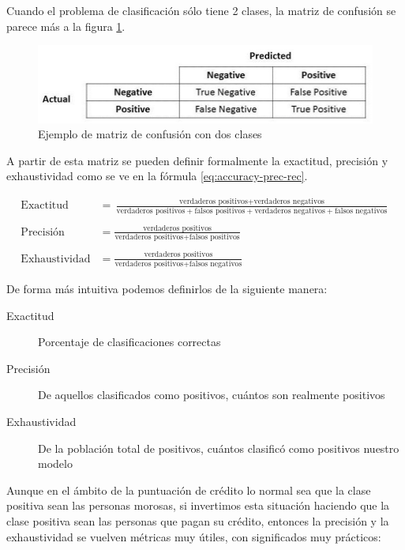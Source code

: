 Cuando el problema de clasificación sólo tiene 2 clases, la matriz de confusión se parece más a la figura \ref{fig:confussion2}.

\begin{figure}
    \centering
    \caption{Ejemplo de matriz de confusión con dos clases}
    \label{fig:confussion2}
    \includegraphics[width=0.8\linewidth]{graficos/confussion_matrix_2.png}
\end{figure}

A partir de esta matriz se pueden definir formalmente la exactitud, precisión y exhaustividad como se ve en la fórmula \ref{eq:accuracy-prec-rec}.

\begin{equation}
    \label{eq:accuracy-prec-rec}
\begin{split}
    \text{Exactitud}  &= \frac{\text{verdaderos positivos} + \text{verdaderos negativos}}{\text{verdaderos positivos} + \text{falsos positivos} + \text{verdaderos negativos} + \text{falsos negativos}} \\\\
    \text{Precisión} &= \frac{\text{verdaderos positivos}}{\text{verdaderos positivos} + \text{falsos positivos}} \\\\
    \text{Exhaustividad}    &= \frac{\text{verdaderos positivos}}{\text{verdaderos positivos} + \text{falsos negativos}} 
\end{split}
\end{equation}

De forma más intuitiva podemos definirlos de la siguiente manera:

\begin{description}
    \item [Exactitud] Porcentaje de clasificaciones correctas
    \item [Precisión] De aquellos clasificados como positivos, cuántos son realmente positivos
    \item [Exhaustividad] De la población total de positivos, cuántos clasificó como positivos nuestro modelo
\end{description}

Aunque en el ámbito de la puntuación de crédito lo normal sea que la clase positiva sean las personas morosas, si invertimos esta situación haciendo que la clase positiva sean las personas que pagan su crédito, entonces la precisión y la exhaustividad se vuelven métricas muy útiles, con significados muy prácticos:

